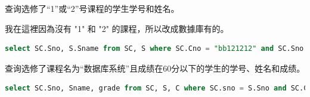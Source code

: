\documentclass[12pt, a4paper]{report}
\begin{document}
查询选修了“1”或“2”号课程的学生学号和姓名。

我在這裡因為沒有 "1" 和 "2" 的課程，所以改成數據庫有的。\\


\begin{lstlisting}[language=SQL]
    select SC.Sno, S.Sname from SC, S where SC.Cno = "bb121212" and SC.Sno union select SC.Sno, S.Sname from SC, S where SC.Cno = "bb131313" and SC.Sno = S.Sno;
\end{lstlisting}

\begin{figure}[H] %
    \centering %
\end{figure}

查询选修了课程名为“数据库系统”且成绩在60分以下的学生的学号、姓名和成绩。\\

\begin{lstlisting}[language=SQL]
    select SC.Sno, Sname, grade from SC, S, C where SC.sno = S.Sno and SC.Cno = C.Cno and Cname = 'SSD7' and grade < 60;
\end{lstlisting}

\begin{figure}[H] %
    \centering %
\end{figure}
\end{document}
